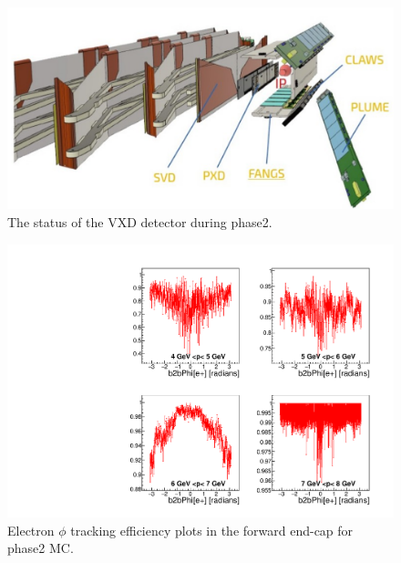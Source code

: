 \documentclass[a4paper,11pt,twosided,final,german,openbib,pdftex,listof=totoc,bibliography=totoc]{scrbook}
\begin{document}
\begin{appendix}
\begin{figure}[h!]
	\centering
	\includegraphics[width=\textwidth]{Bilder/VXD_phaseII.png}
	\caption[The Status Of the VXD In Phase2]{The status of the VXD detector during phase2.\cite{phase2vxd}}
	\label{fig:phase2vxd}
\end{figure}








\begin{figure}[!htbp]
	\centering
	\includegraphics[width=\textwidth]{Plots/master/xPMPhiemFC_MC}
	\caption[Momentum $\phi$ Electron Forward End-Cap Efficiency Phase2 MC]{Electron $\phi$ tracking efficiency plots in the forward end-cap for phase2 MC.}
	\label{plt:PMPhiemFC_MC}
\end{figure}



\end{appendix}
\end{document}
